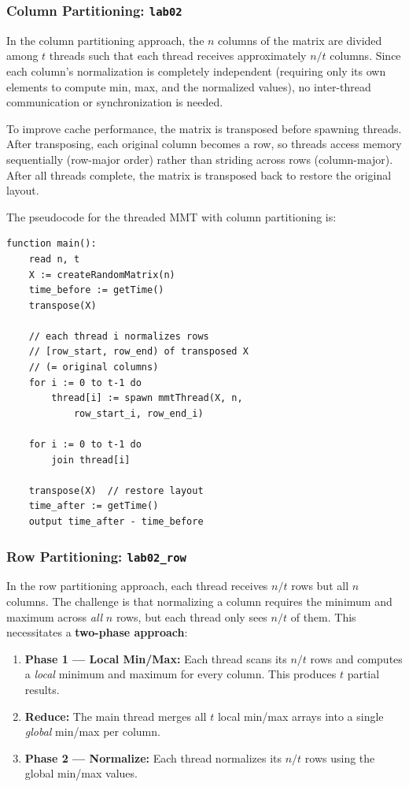\documentclass[journal]{IEEEtran}
\begin{document}
\subsubsection{Column Partitioning: \texttt{lab02}}

In the column partitioning approach, the $n$ columns of the matrix are divided among $t$ threads such that each thread receives approximately $n/t$ columns. Since each column's normalization is completely independent (requiring only its own elements to compute min, max, and the normalized values), no inter-thread communication or synchronization is needed.

To improve cache performance, the matrix is transposed before spawning threads. After transposing, each original column becomes a row, so threads access memory sequentially (row-major order) rather than striding across rows (column-major). After all threads complete, the matrix is transposed back to restore the original layout.

The pseudocode for the threaded MMT with column partitioning is:

\begin{lstlisting}[style=ccode, caption={Column Partitioning Pseudocode}]
function main():
    read n, t
    X := createRandomMatrix(n)
    time_before := getTime()
    transpose(X)
    
    // each thread i normalizes rows
    // [row_start, row_end) of transposed X
    // (= original columns)
    for i := 0 to t-1 do
        thread[i] := spawn mmtThread(X, n, 
            row_start_i, row_end_i)
    
    for i := 0 to t-1 do
        join thread[i]
    
    transpose(X)  // restore layout
    time_after := getTime()
    output time_after - time_before
\end{lstlisting}

\subsubsection{Row Partitioning: \texttt{lab02\_row}}

In the row partitioning approach, each thread receives $n/t$ rows but all $n$ columns. The challenge is that normalizing a column requires the minimum and maximum across \textit{all} $n$ rows, but each thread only sees $n/t$ of them. This necessitates a \textbf{two-phase approach}:

\begin{enumerate}
    \item \textbf{Phase 1 --- Local Min/Max:} Each thread scans its $n/t$ rows and computes a \textit{local} minimum and maximum for every column. This produces $t$ partial results.
    \item \textbf{Reduce:} The main thread merges all $t$ local min/max arrays into a single \textit{global} min/max per column.
    \item \textbf{Phase 2 --- Normalize:} Each thread normalizes its $n/t$ rows using the global min/max values.
\end{enumerate}
\end{document}
